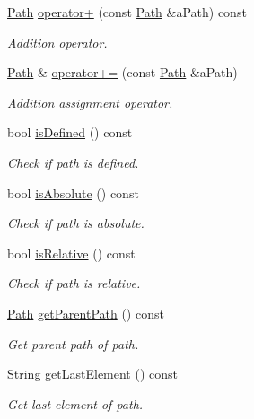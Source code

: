 \begin{DoxyCompactItemize}
\hyperlink{classostk_1_1core_1_1fs_1_1_path}{Path} \hyperlink{classostk_1_1core_1_1fs_1_1_path_a0f2659ad453d0648b1a0888e90a0a9ed}{operator+} (const \hyperlink{classostk_1_1core_1_1fs_1_1_path}{Path} \&a\+Path) const
\begin{DoxyCompactList}\small\item\em Addition operator. \end{DoxyCompactList}\item 
\hyperlink{classostk_1_1core_1_1fs_1_1_path}{Path} \& \hyperlink{classostk_1_1core_1_1fs_1_1_path_afa271ae42cee66d28f4aab1210922354}{operator+=} (const \hyperlink{classostk_1_1core_1_1fs_1_1_path}{Path} \&a\+Path)
\begin{DoxyCompactList}\small\item\em Addition assignment operator. \end{DoxyCompactList}\item 
bool \hyperlink{classostk_1_1core_1_1fs_1_1_path_a4dc8b6e6ee6215a456bbfe0a452d3c77}{is\+Defined} () const
\begin{DoxyCompactList}\small\item\em Check if path is defined. \end{DoxyCompactList}\item 
bool \hyperlink{classostk_1_1core_1_1fs_1_1_path_a2e2b112358d457c0a1c193497c2c63da}{is\+Absolute} () const
\begin{DoxyCompactList}\small\item\em Check if path is absolute. \end{DoxyCompactList}\item 
bool \hyperlink{classostk_1_1core_1_1fs_1_1_path_a24e2719af3a16c88930aa0a1d03625c4}{is\+Relative} () const
\begin{DoxyCompactList}\small\item\em Check if path is relative. \end{DoxyCompactList}\item 
\hyperlink{classostk_1_1core_1_1fs_1_1_path}{Path} \hyperlink{classostk_1_1core_1_1fs_1_1_path_a9304d079e30c775a45c07913d781c7cc}{get\+Parent\+Path} () const
\begin{DoxyCompactList}\small\item\em Get parent path of path. \end{DoxyCompactList}\item 
\hyperlink{classostk_1_1core_1_1types_1_1_string}{String} \hyperlink{classostk_1_1core_1_1fs_1_1_path_a867fa80085bd7dd23b9856096ab6c115}{get\+Last\+Element} () const
\begin{DoxyCompactList}\small\item\em Get last element of path. \end{DoxyCompactList}\item 

\end{DoxyCompactItemize}
